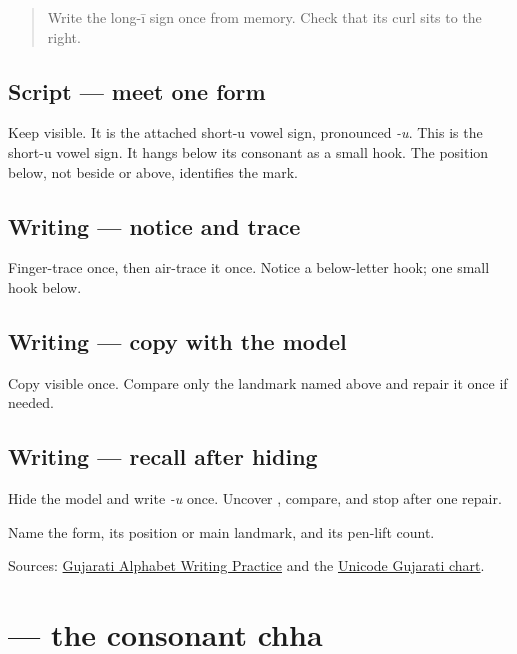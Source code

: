 \label{lesson:GU-W03-u-matra}



\begin{quote}
Write the long-ī sign once from memory. Check that its curl sits to the right.
\end{quote}

\subsection*{Script — meet one form}
Keep \textbf{} visible. It is the attached short-u vowel sign, pronounced \emph{-u}. This is the short-u vowel sign. It hangs below its consonant as a small hook. The position below, not beside or above, identifies the mark.

\subsection*{Writing — notice and trace}

Finger-trace \textbf{} once, then air-trace it once. Notice a below-letter hook; one small hook below.

\subsection*{Writing — copy with the model}
Copy visible \textbf{} once. Compare only the landmark named above and repair it once if needed.

\subsection*{Writing — recall after hiding}
Hide the model and write \emph{-u} once. Uncover \textbf{}, compare, and stop after one repair.

\begin{tcolorbox}[breakable,colback=teal!4,colframe=teal!35!black,title={Before you move on}]
Name the form, its position or main landmark, and its pen-lift count.

Sources: \href{https://www.t30apps.com/gujarati-alphabet-writing/}{Gujarati Alphabet Writing Practice} and the \href{https://www.unicode.org/charts/PDF/U0A80.pdf}{Unicode Gujarati chart}.
\end{tcolorbox}
\section[\texorpdfstring{\gu{છ} (chha)}{છ (chha)}]{ — the consonant chha}

